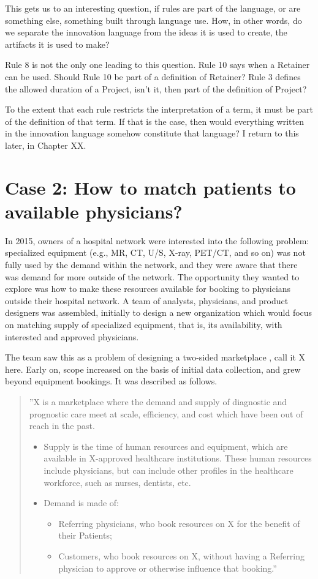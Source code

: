 \documentclass[graybox,envcountchap,sectrefs]{svmono}
\begin{document}
This gets us to an interesting question, if rules are part of the language, or are something else, something built through language use. How, in other words, do we separate the innovation language from the ideas it is used to create, the artifacts it is used to make?

Rule 8 is not the only one leading to this question. Rule 10 says when a Retainer can be used. Should Rule 10 be part of a definition of Retainer? Rule 3 defines the allowed duration of a Project, isn't it, then part of the definition of Project?

To the extent that each rule restricts the interpretation of a term, it must be part of the definition of that term. If that is the case, then would everything written in the innovation language somehow constitute that language? I return to this later, in Chapter XX.


\section{Case 2: How to match patients to available physicians?}
\label{c5:s3}
In 2015, owners of a hospital network were interested into the following problem: specialized equipment (e.g., MR, CT, U/S, X-ray, PET/CT, and so on) was not fully used by the demand within the network, and they were aware that there was demand for more outside of the network. The opportunity they wanted to explore was how to make these resources available for booking to physicians outside their hospital network. A team of analysts, physicians, and product designers was assembled, initially to design a new organization which would focus on matching supply of specialized equipment, that is, its availability, with interested and approved physicians. 

The team saw this as a problem of designing a two-sided marketplace \cite{roson2005two,rochet2006two}, call it X here. Early on, scope increased on the basis of initial data collection, and grew beyond equipment bookings. It was described as follows.

\begin{quote}
''X is a marketplace where the demand and supply of diagnostic and prognostic care meet at scale, efficiency, and cost which have been out of reach in the past.
\begin{itemize}
	\item Supply is the time of human resources and equipment, which are available in X-approved healthcare institutions. These human resources include physicians, but can include other profiles in the healthcare workforce, such as nurses, dentists, etc. 
	\item Demand is made of:
	\begin{itemize}
		\item Referring physicians, who book resources on X for the benefit of their Patients;
		\item Customers, who book resources on X, without having a Referring physician to approve or otherwise influence that booking.''
	\end{itemize}
\end{itemize}
\end{quote}
\end{document}

